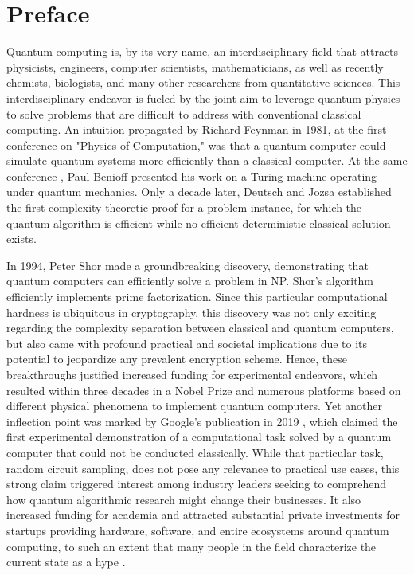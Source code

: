 \documentclass[../main.tex]{subfiles}
\begin{document}
\section{Preface}

Quantum computing is, by its very name, an interdisciplinary field that attracts physicists, engineers, computer scientists, mathematicians, as well as recently chemists, biologists, and many other researchers from quantitative sciences. This interdisciplinary endeavor is fueled by the joint aim to leverage quantum physics to solve problems that are difficult to address with conventional classical computing.
An intuition propagated by Richard Feynman in 1981, at the first conference on "Physics of Computation," was that a quantum computer could simulate quantum systems more efficiently than a classical computer. At the same conference \cite{history_quantum}, Paul Benioff presented his work on a Turing machine operating under quantum mechanics. Only a decade later, Deutsch and Jozsa established the first complexity-theoretic proof for a problem instance, for which the quantum algorithm is efficient while no efficient deterministic classical solution exists.

In 1994, Peter Shor made a groundbreaking discovery, demonstrating that quantum computers can efficiently solve a problem in NP. Shor's algorithm efficiently implements prime factorization. Since this particular computational hardness is ubiquitous in cryptography, this discovery was not only exciting regarding the complexity separation between classical and quantum computers, but also came with profound practical and societal implications due to its potential to jeopardize any prevalent encryption scheme.
Hence, these breakthroughs justified increased funding for experimental endeavors, which resulted within three decades in a Nobel Prize and numerous platforms based on different physical phenomena to implement quantum computers. Yet another inflection point was marked by Google's publication in 2019 \cite{arute2019quantum}, which claimed the first experimental demonstration of a computational task solved by a quantum computer that could not be conducted classically. While that particular task, random circuit sampling, does not pose any relevance to practical use cases, this strong claim triggered interest among industry leaders seeking to comprehend how quantum algorithmic research might change their businesses. It also increased funding for academia and attracted substantial private investments for startups providing hardware, software, and entire ecosystems around quantum computing, to such an extent that many people in the field characterize the current state as a hype \cite{sarma2022quantum,hoefler2023disentangling}.
\end{document}
